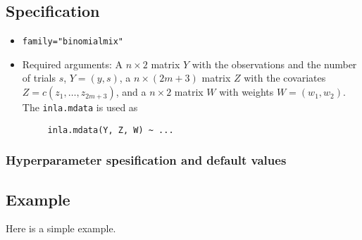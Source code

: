 \documentclass[a4paper,11pt]{article}
\begin{document}
\subsection*{Specification}

\begin{itemize}
\item \texttt{family="binomialmix"}
\item Required arguments: A $n\times 2$ matrix $Y$ with the
    observations and the number of trials $s$,  $Y=(y, s)$,
    a $n\times (2m+3)$ matrix $Z$ with the covariates $Z=c(z_1, \ldots, z_{2m+3})$,
    and a $n\times 2$ matrix $W$ with weights $W=(w_1, w_2)$. The
    \texttt{inla.mdata} is used as
\begin{verbatim}
     inla.mdata(Y, Z, W) ~ ...
\end{verbatim}
\end{itemize}


\clearpage
\subsubsection*{Hyperparameter spesification and default values}
{\small }

\clearpage
\subsection*{Example}
Here is a simple example.

{\small }
\end{document}
